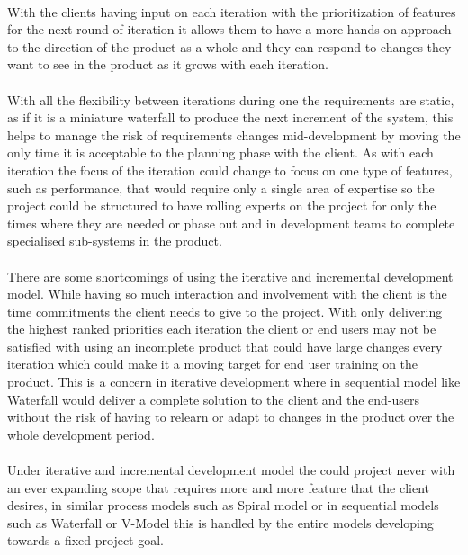 \documentclass{style/CRPITStyle}
\begin{document}
\paragraph{}

With the clients having input on each iteration with the prioritization of
features for the next round of iteration it allows them to have a more hands on
approach to the direction of the product as a whole and they can respond to
changes they want to see in the product as it grows with each iteration.

\paragraph{}

With all the flexibility between iterations during one the requirements are
static, as if it is a miniature waterfall to produce the next increment of the
system, this helps to manage the risk of requirements changes mid-development
by moving the only time it is acceptable to the planning phase with the client.
As with each iteration the focus of the iteration could change to focus on one
type of features, such as performance, that would require only a single area
of expertise so the project could be structured to have rolling experts on the
project for only the times where they are needed or phase out and in development
teams to complete specialised sub-systems in the product.

\paragraph{}

There are some shortcomings of using the iterative and incremental development model.
While having so much interaction and involvement with the client is the time
commitments the client needs to give to the project.
With only delivering the highest ranked priorities each iteration the client or end users may not be
satisfied with using an incomplete product that could have large changes every
iteration which could make it a moving target for end user training on the
product. This is a concern in iterative development where in sequential model
like Waterfall would deliver a complete solution to the client and the end-users
without the risk of having to relearn or adapt to changes in the product over
the whole development period.

\paragraph{}
Under iterative and incremental development model the could project never with
an ever expanding scope that requires more and more feature that the client
desires, in similar process models such as Spiral model or in sequential models
such as Waterfall or V-Model this is handled by the entire models developing
towards a fixed project goal.
\end{document}
